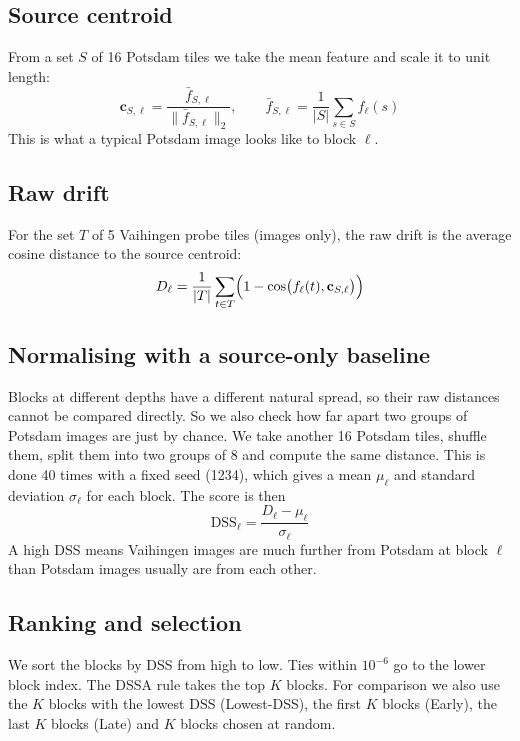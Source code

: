 \documentclass[11pt,a4paper]{report}
\begin{document}
\subsection{Source centroid}

From a set $S$ of 16 Potsdam tiles we take the mean feature and scale it to unit length:
\begin{equation}
    \mathbf{c}_{S,\ell} = \frac{\bar f_{S,\ell}}{\lVert \bar f_{S,\ell} \rVert_2}, \qquad \bar f_{S,\ell} = \frac{1}{|S|}\sum_{s \in S} f_\ell(s)
\end{equation}
This is what a typical Potsdam image looks like to block $\ell$.

\subsection{Raw drift}

For the set $T$ of 5 Vaihingen probe tiles (images only), the raw drift is the average cosine distance to the source centroid:
\begin{equation}
    D_\ell = \frac{1}{|T|} \sum_{t \in T} \Bigl(1 - \cos\bigl(f_\ell(t), \mathbf{c}_{S,\ell}\bigr)\Bigr)
\end{equation}

\subsection{Normalising with a source-only baseline}

Blocks at different depths have a different natural spread, so their raw distances cannot be compared directly. So we also check how far apart two groups of Potsdam images are just by chance. We take another 16 Potsdam tiles, shuffle them, split them into two groups of 8 and compute the same distance. This is done 40 times with a fixed seed (1234), which gives a mean $\mu_\ell$ and standard deviation $\sigma_\ell$ for each block. The score is then
\begin{equation}
    \text{DSS}_\ell = \frac{D_\ell - \mu_\ell}{\sigma_\ell}
\end{equation}
A high DSS means Vaihingen images are much further from Potsdam at block $\ell$ than Potsdam images usually are from each other.

\subsection{Ranking and selection}

We sort the blocks by DSS from high to low. Ties within $10^{-6}$ go to the lower block index. The DSSA rule takes the top $K$ blocks. For comparison we also use the $K$ blocks with the lowest DSS (Lowest-DSS), the first $K$ blocks (Early), the last $K$ blocks (Late) and $K$ blocks chosen at random.
\end{document}
